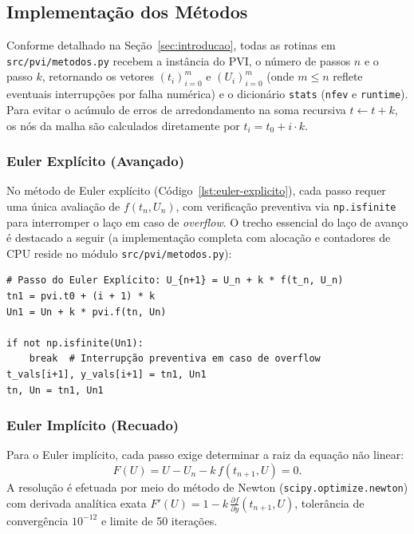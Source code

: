 \documentclass[12pt, a4paper]{article}
\begin{document}
\subsection{Implementação dos Métodos}
\label{sec:a-implementacao}

Conforme detalhado na Seção~\ref{sec:introducao}, todas as rotinas em \texttt{src/pvi/metodos.py} recebem a instância do PVI, o número de passos $n$ e o passo $k$, retornando os vetores $(t_i)_{i=0}^m$ e $(U_i)_{i=0}^m$ (onde $m \le n$ reflete eventuais interrupções por falha numérica) e o dicionário \texttt{stats} (\texttt{nfev} e \texttt{runtime}). Para evitar o acúmulo de erros de arredondamento na soma recursiva $t \leftarrow t + k$, os nós da malha são calculados diretamente por $t_{i} = t_0 + i \cdot k$.

\subsubsection{Euler Explícito (Avançado)}

No método de Euler explícito (Código~\ref{lst:euler-explicito}), cada passo requer uma única avaliação de $f(t_n, U_n)$, com verificação preventiva via \texttt{np.isfinite} para interromper o laço em caso de \emph{overflow}. O trecho essencial do laço de avanço é destacado a seguir (a implementação completa com alocação e contadores de CPU reside no módulo \texttt{src/pvi/metodos.py}):
\begin{listing}[H]
\caption{Núcleo do passo de avanço temporal do método de Euler Avançado.}\label{lst:euler-explicito}
\begin{verbatim}
# Passo do Euler Explícito: U_{n+1} = U_n + k * f(t_n, U_n)
tn1 = pvi.t0 + (i + 1) * k
Un1 = Un + k * pvi.f(tn, Un)

if not np.isfinite(Un1):
    break  # Interrupção preventiva em caso de overflow
t_vals[i+1], y_vals[i+1] = tn1, Un1
tn, Un = tn1, Un1
\end{verbatim}
\end{listing}

\subsubsection{Euler Implícito (Recuado)}

Para o Euler implícito, cada passo exige determinar a raiz da equação não linear:
\begin{equation}\label{eq:residuo-be}
  F(U) = U - U_n - k\, f(t_{n+1}, U) = 0.
\end{equation}
A resolução é efetuada por meio do método de Newton (\texttt{scipy.optimize.newton})
com derivada analítica exata
$F'(U) = 1 - k\,\frac{\partial f}{\partial y}(t_{n+1}, U)$, tolerância de
convergência $10^{-12}$ e limite de 50 iterações.
\end{document}
